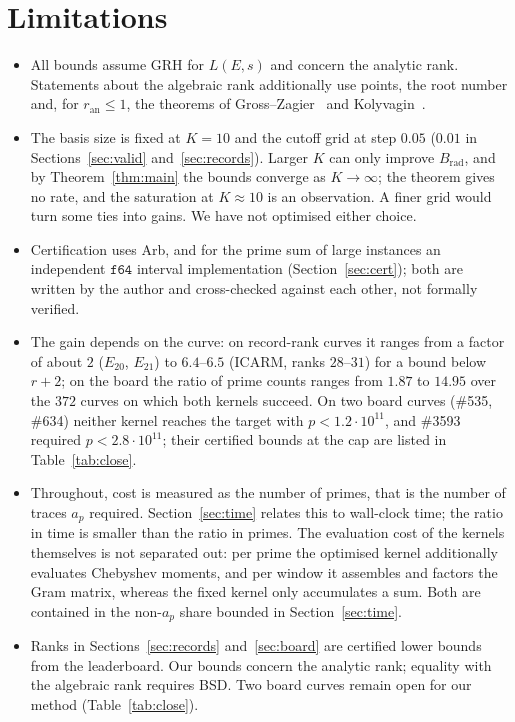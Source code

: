 \documentclass[11pt]{amsart}
\theoremstyle{remark}
\theoremstyle{definition}
\newcommand{\ran}{r_{\mathrm{an}}}
\begin{document}
\section{Limitations}
\begin{itemize}
\item All bounds assume GRH for $L(E,s)$ and concern the analytic rank. Statements about the algebraic rank additionally use points, the root number and, for $\ran\le1$, the theorems of Gross--Zagier~\cite{GZ} and Kolyvagin~\cite{Kolyvagin}.
\item The basis size is fixed at $K=10$ and the cutoff grid at step $0.05$ ($0.01$ in Sections~\ref{sec:valid} and~\ref{sec:records}). Larger $K$ can only improve $B_{\mathrm{rad}}$, and by Theorem~\ref{thm:main} the bounds converge as $K\to\infty$; the theorem gives no rate, and the saturation at $K\approx10$ is an observation. A finer grid would turn some ties into gains. We have not optimised either choice.
\item Certification uses Arb, and for the prime sum of large instances an independent $\mathtt{f64}$ interval implementation (Section~\ref{sec:cert}); both are written by the author and cross-checked against each other, not formally verified.
\item The gain depends on the curve: on record-rank curves it ranges from a factor of about $2$ ($E_{20}$, $E_{21}$) to $6.4$--$6.5$ (ICARM, ranks $28$--$31$) for a bound below $r+2$; on the board the ratio of prime counts ranges from $1.87$ to $14.95$ over the $372$ curves on which both kernels succeed. On two board curves (\#535, \#634) neither kernel reaches the target with $p<1.2\cdot10^{11}$, and \#3593 required $p<2.8\cdot10^{11}$; their certified bounds at the cap are listed in Table~\ref{tab:close}.
\item Throughout, cost is measured as the number of primes, that is the number of traces $a_p$
required. Section~\ref{sec:time} relates this to wall-clock time; the ratio in time is smaller
than the ratio in primes. The evaluation cost of the kernels themselves is not separated out:
per prime the optimised kernel additionally evaluates Chebyshev moments, and per window it
assembles and factors the Gram matrix, whereas the fixed kernel only accumulates a sum. Both
are contained in the non-$a_p$ share bounded in Section~\ref{sec:time}.
\item Ranks in Sections~\ref{sec:records} and~\ref{sec:board} are certified lower bounds from the leaderboard. Our bounds concern the analytic rank; equality with the algebraic rank requires BSD. Two board curves remain open for our method (Table~\ref{tab:close}).
\end{itemize}
\end{document}
